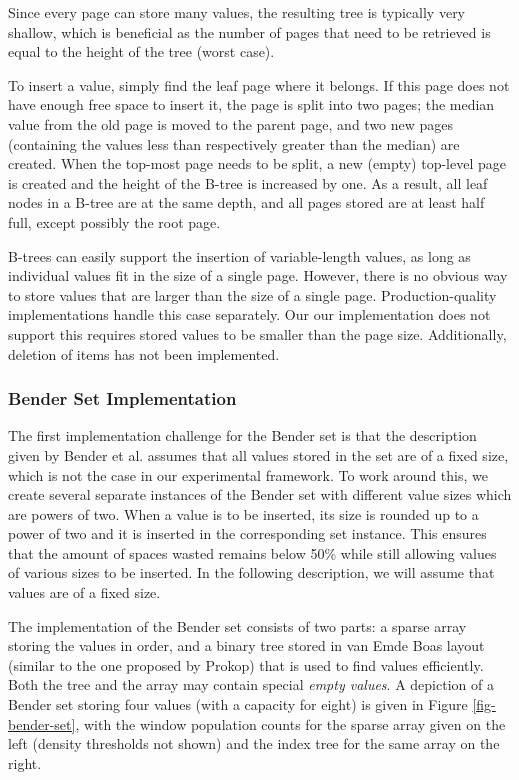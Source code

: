 \documentclass{acm_proc_article-sp}
\begin{document}
Since every page can store many values, the resulting tree is typically very
shallow, which is beneficial as the number of pages that need to be retrieved
is equal to the height of the tree (worst case).

To insert a value, simply find the leaf page where it belongs. If this page
does not have enough free space to insert it, the page is split into two pages;
the median value from the old page is moved to the parent page, and two new pages
(containing the values less than respectively greater than the median) are
created. When the top-most page needs to be split, a new (empty) top-level page is
created and the height of the B-tree is increased by one. As a result, all leaf
nodes in a B-tree are at the same depth, and all pages stored are at least half
full, except possibly the root page.


B-trees can easily support the insertion of variable-length values, as long
as individual values fit in the size of a single page. However, there is no
obvious way to store values that are larger than the size of a single page.
Production-quality implementations handle this case separately. Our our
implementation does not support this requires stored values to
be smaller than the page size. Additionally, deletion of items has not been
implemented.

\subsubsection{Bender Set Implementation}
The first implementation challenge for the Bender set is that the description
given by Bender et al. assumes that all values stored in the set are of a
fixed size, which is not the case in our experimental framework. To work
around this, we create several separate instances of the Bender set with
different value sizes which are powers of two. When a value is to be inserted,
its size is rounded up to a power of two and it is inserted in the
corresponding set instance. This ensures that the amount of spaces wasted
remains below 50\% while still allowing values of various sizes to be inserted.
In the following description, we will assume that values are of a fixed size.

The implementation of the Bender set consists of two parts: a sparse array
storing the values in order, and a binary tree stored in van Emde Boas
layout (similar to the one proposed by Prokop) that is used to find values
efficiently.
Both the tree and the array may contain special \emph{empty values}.
A depiction of a Bender set storing four values (with a capacity for eight) is
given in Figure \ref{fig-bender-set}, with the window population counts for
the sparse array given on the left (density thresholds not shown) and the index tree for the same array on the right.
\end{document}
